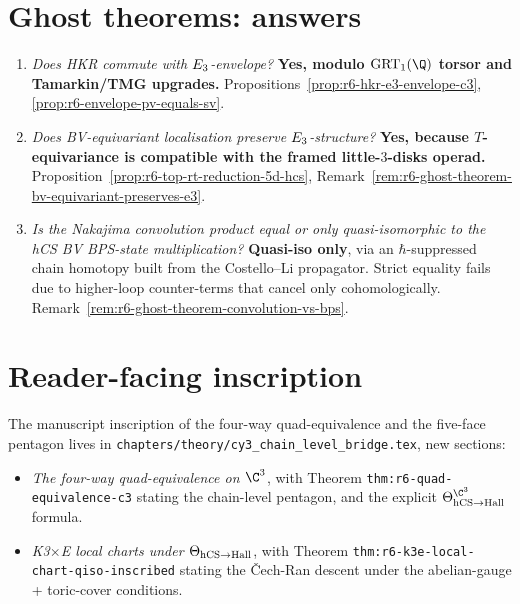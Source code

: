 \section*{Ghost theorems: answers}

\begin{enumerate}
\item[\textbf{G1.}] \emph{Does HKR commute with $E_3$-envelope?}
\textbf{Yes, modulo $\GRT_1(\Q)$ torsor and Tamarkin/TMG upgrades.}
Propositions~\ref{prop:r6-hkr-e3-envelope-c3},
\ref{prop:r6-envelope-pv-equals-sv}.

\item[\textbf{G2.}] \emph{Does BV-equivariant localisation preserve
$E_3$-structure?} \textbf{Yes, because $T$-equivariance is
compatible with the framed little-$3$-disks operad.}
Proposition~\ref{prop:r6-top-rt-reduction-5d-hcs},
Remark~\ref{rem:r6-ghost-theorem-bv-equivariant-preserves-e3}.

\item[\textbf{G3.}] \emph{Is the Nakajima convolution product equal
or only quasi-isomorphic to the hCS BV BPS-state multiplication?}
\textbf{Quasi-iso only}, via an $\hbar$-suppressed chain homotopy
built from the Costello--Li propagator. Strict equality fails due to
higher-loop counter-terms that cancel only cohomologically.
Remark~\ref{rem:r6-ghost-theorem-convolution-vs-bps}.
\end{enumerate}

\section*{Reader-facing inscription}

The manuscript inscription of the four-way quad-equivalence and the
five-face pentagon lives in
\texttt{chapters/theory/cy3\_chain\_level\_bridge.tex}, new sections:
\begin{itemize}
\item \emph{The four-way quad-equivalence on $\C^3$}, with Theorem
\texttt{thm:r6-quad-equivalence-c3} stating the chain-level pentagon,
and the explicit $\Theta_{\hCS\to\Hall}^{\C^3}$ formula.
\item \emph{K3$\times$E local charts under $\Theta_{\mathrm{hCS}\to\mathrm{Hall}}$},
with Theorem \texttt{thm:r6-k3e-local-chart-qiso-inscribed} stating
the \v{C}ech-Ran descent under the abelian-gauge + toric-cover
conditions.
\end{itemize}

